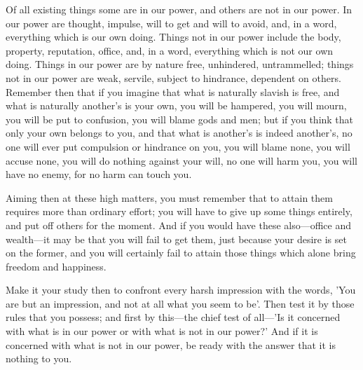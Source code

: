 Of all existing things some are in our  power, and others are not in our power.
In our  power are thought, impulse,  will to get and  will to avoid, and,  in a
word, everything which  is our own doing.  Things not in our  power include the
body, property, reputation, office, and, in a word, everything which is not our
own doing.  Things in our power  are by nature free,  unhindered, untrammelled;
things not in  our power are weak, servile, subject  to hindrance, dependent on
others. Remember  then that if  you imagine that  what is naturally  slavish is
free, and what  is naturally another's is  your own, you will  be hampered, you
will mourn, you will  be put to confusion, you will blame gods  and men; but if
you think  that only your  own belongs  to you, and  that what is  another's is
indeed another's, no one will ever put compulsion or hindrance on you, you will
blame none, you will accuse none, you will do nothing against your will, no one
will harm you, you will have no enemy, for no harm can touch you.

Aiming  then at  these high  matters,  you must  remember that  to attain  them
requires  more than  ordinary effort;  you  will have  to give  up some  things
entirely,  and put  off others  for the  moment. And  if you  would have  these
also—office  and wealth—it  may be  that you  will fail  to get  them, just
because your desire is set on the former, and you will certainly fail to attain
those things which alone bring freedom and happiness.

Make it your study then to confront every harsh impression with the words, 'You
are but  an impression, and not  at all what you  seem to be'. Then  test it by
those rules that  you possess; and first by this—the  chief test of all—'Is
it concerned with what  is in our power or with what is  not in our power?' And
if it is concerned with what is not in our power, be ready with the answer that
it is nothing to you.
